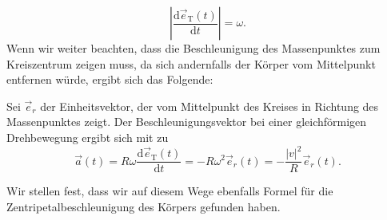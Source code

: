 \begin{MExtra}
  \begin{equation}\left\vert\frac{\textrm{d}\vec{e}_{\textrm{T}}(t)}{\textrm{d}t}\right\vert=\omega. 
  \end{equation}Wenn wir weiter beachten, dass die Beschleunigung des Massenpunktes zum Kreiszentrum zeigen muss, da sich andernfalls der K\"orper vom Mittelpunkt entfernen w\"urde, ergibt sich das Folgende:
  
  \begin{MInfo}
   Sei $\vec{e}_r$ der Einheitsvektor, der vom Mittelpunkt des Kreises in Richtung des Massenpunktes zeigt. Der Beschleunigungsvektor bei einer gleichf\"ormigen Drehbewegung ergibt sich mit  zu
  $$
  \vec{a}(t)=R\omega\frac{\textrm{d}\vec{e}_{\textrm{T}}(t)}{\textrm{d}t}=-R\omega^2\vec{e}_r(t)=-\frac{\vert v\vert^2}{R}\vec{e}_r(t).
  $$ 
  \end{MInfo}
  Wir stellen fest, dass wir auf diesem Wege ebenfalls Formel  f\"ur die Zentripetalbeschleunigung des K\"orpers gefunden haben.
  
  \end{MExtra}
  
